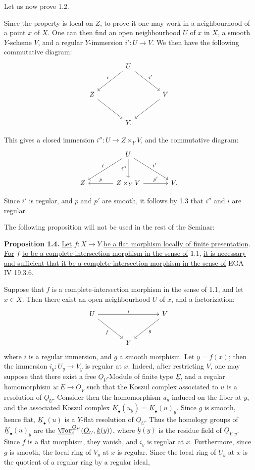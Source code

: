 Let us now prove 1.2.

Since the property is local on $Z$, to prove it one may work in a neighbourhood of a point $x$ of $X$. One can then find an open neighbourhood $U$ of $x$ in $X$, a smooth $Y$-scheme $V$, and a regular $Y$-immersion $i':U\to V$. We then have the following commutative diagram:
\[
\begin{tikzcd}[column sep=large,row sep=large]
& U \arrow[dl,"i"'] \arrow[dr,"i'"] &\\
Z \arrow[dr] && V \arrow[dl]\\
& Y . &
\end{tikzcd}
\]

This gives a closed immersion $i'':U\to Z\times_Y V$, and the commutative diagram:
\[
\begin{tikzcd}[column sep=large,row sep=large]
& U \arrow[dl,"i"'] \arrow[d,"i''"'] \arrow[dr,"i'"] &\\
Z & Z\times_Y V \arrow[l,"p"'] \arrow[r,"p'"] & V.
\end{tikzcd}
\]

%
Since $i'$ is regular, and $p$ and $p'$ are smooth, it follows by 1.3 that $i''$ and $i$ are regular.

The following proposition will not be used in the rest of the Seminar:

\textbf{Proposition 1.4.} \uline{Let} $f:X\to Y$ \uline{be a flat morphism locally of finite presentation}. \uline{For} $f$ \uline{to be a complete-intersection morphism in the sense of} 1.1, \uline{it is necessary and sufficient that it be a complete-intersection morphism in the sense of} EGA IV 19.3.6.

Suppose that $f$ is a complete-intersection morphism in the sense of 1.1, and let $x\in X$. Then there exist an open neighbourhood $U$ of $x$, and a factorization:
\[
\begin{tikzcd}[column sep=large,row sep=large]
U \arrow[rr,"i"] \arrow[dr,"f"'] && V \arrow[dl,"g"]\\
& Y &
\end{tikzcd}
\]
where $i$ is a regular immersion, and $g$ a smooth morphism. Let $y=f(x)$; then the immersion $i_y:U_y\to V_y$ is regular at $x$. Indeed, after restricting $V$, one may suppose that there exist a free $\underline{O}_V$-Module of finite type $\underline{E}$, and a regular homomorphism $u:\underline{E}\to\underline{O}_V$ such that the Koszul complex associated to $u$ is a resolution of $\underline{O}_U$. Consider then the homomorphism $u_y$ induced on the fiber at $y$, and the associated Koszul complex $\underline{K}_\bullet(u_y)=\underline{K}_\bullet(u)_y$. Since $g$ is smooth, hence flat, $\underline{K}_\bullet(u)$ is a $Y$-flat resolution of $\underline{O}_U$. Thus the homology groups of $\underline{K}_\bullet(u)_y$ are the $\underline{\Tor}_i^{\underline{O}_Y}(\underline{O}_U,\underline{k}(y))$, where $\underline{k}(y)$ is the residue field of $\underline{O}_{Y,y}$. Since $f$ is a flat morphism, they vanish, and $i_y$ is regular at $x$. Furthermore, since $g$ is smooth, the local ring of $V_y$ at $x$ is regular. Since the local ring of $U_y$ at $x$ is the quotient of a regular ring by a regular ideal,
